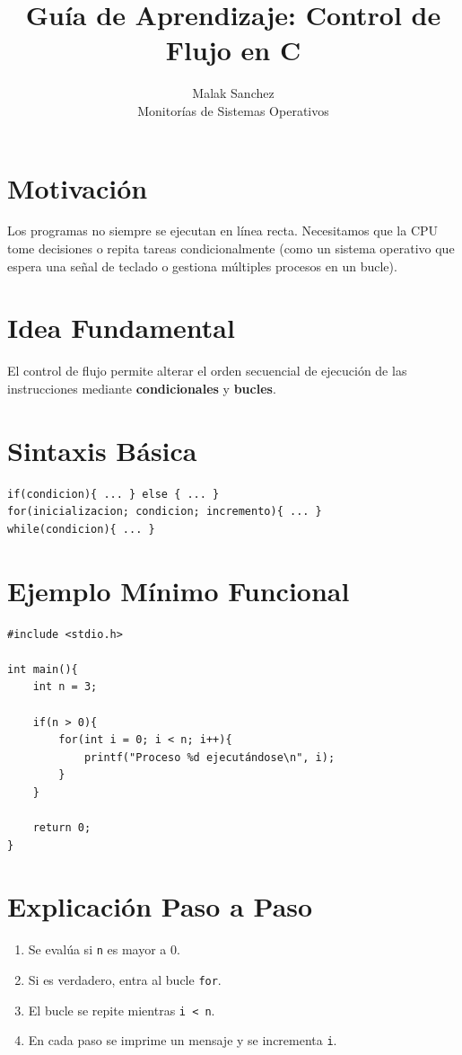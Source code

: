 \documentclass[12pt,a4paper]{article}
\title{\textbf{Guía de Aprendizaje: Control de Flujo en C}}
\author{Malak Sanchez \\ \small Monitorías de Sistemas Operativos}
\date{}
\begin{document}
\maketitle

\section{Motivación}
Los programas no siempre se ejecutan en línea recta. Necesitamos que la CPU tome decisiones o repita tareas condicionalmente (como un sistema operativo que espera una señal de teclado o gestiona múltiples procesos en un bucle).

\section{Idea Fundamental}
El control de flujo permite alterar el orden secuencial de ejecución de las instrucciones mediante \textbf{condicionales} y \textbf{bucles}.

\section{Sintaxis Básica}
\begin{lstlisting}[numbers=none]
if(condicion){ ... } else { ... }
for(inicializacion; condicion; incremento){ ... }
while(condicion){ ... }
\end{lstlisting}

\section{Ejemplo Mínimo Funcional}
\begin{lstlisting}
#include <stdio.h>

int main(){
    int n = 3;

    if(n > 0){
        for(int i = 0; i < n; i++){
            printf("Proceso %d ejecutándose\n", i);
        }
    }

    return 0;
}
\end{lstlisting}

\section{Explicación Paso a Paso}
\begin{enumerate}
    \item Se evalúa si \texttt{n} es mayor a 0.
    \item Si es verdadero, entra al bucle \texttt{for}.
    \item El bucle se repite mientras \texttt{i < n}.
    \item En cada paso se imprime un mensaje y se incrementa \texttt{i}.
\end{enumerate}
\end{document}

